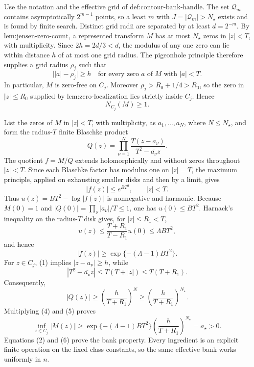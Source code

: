 Use the notation and the effective grid of \(\text{def:contour-bank-handle}\).  The set \(\mathcal Q_m\) contains asymptotically \(2^{m-1}\) points, so a least \(m\) with \(J=|\mathcal Q_m|>N_{\star}\) exists and is found by finite search.  Distinct grid radii are separated by at least \(d=2^{-m}\).  By \(\text{lem:jensen-zero-count}\), a represented transform \(M\) has at most \(N_{\star}\) zeros in \(|z|<T\), with multiplicity.  Since \(2h=2d/3<d\), the modulus of any one zero can lie within distance \(h\) of at most one grid radius.  The pigeonhole principle therefore supplies a grid radius \(\rho_j\) such that
\[
 \bigl||a|-\rho_j\bigr|\ge h
 \quad\text{for every zero }a\text{ of }M\text{ with }|a|<T. \tag{1}
\]
In particular, \(M\) is zero-free on \(C_j\).  Moreover \(\rho_j>R_0+1/4>R_0\), so the zero in \(|z|\le R_0\) supplied by \(\text{lem:zero-localization}\) lies strictly inside \(C_j\).  Hence
\[
 N_{C_j}(M)\ge1. \tag{2}
\]

List the zeros of \(M\) in \(|z|<T\), with multiplicity, as \(a_1,\ldots,a_N\), where \(N\le N_{\star}\), and form the radius-\(T\) finite Blaschke product
\[
 Q(z)=\prod_{\nu=1}^{N}
 \frac{T(z-a_{\nu})}{T^2-\overline{a_{\nu}}z}.
\]
The quotient \(f=M/Q\) extends holomorphically and without zeros throughout \(|z|<T\).  Since each Blaschke factor has modulus one on \(|z|=T\), the maximum principle, applied on exhausting smaller disks and then by a limit, gives
\[
 |f(z)|\le e^{BT^2},\qquad |z|<T. \tag{3}
\]
Thus \(u(z)=BT^2-\log|f(z)|\) is nonnegative and harmonic.  Because \(M(0)=1\) and \(|Q(0)|=\prod_{\nu}|a_{\nu}|/T\le1\), one has \(u(0)\le BT^2\).  Harnack's inequality on the radius-\(T\) disk gives, for \(|z|\le R_1<T\),
\[
 u(z)\le\frac{T+R_1}{T-R_1}u(0)
 \le\Lambda BT^2,
\]
and hence
\[
 |f(z)|\ge \exp\{-(\Lambda-1)BT^2\}. \tag{4}
\]
For \(z\in C_j\), (1) implies \(|z-a_{\nu}|\ge h\), while
\[
 |T^2-\overline{a_{\nu}}z|
 \le T(T+|z|)\le T(T+R_1).
\]
Consequently,
\[
 |Q(z)|
 \ge\left(\frac{h}{T+R_1}\right)^N
 \ge\left(\frac{h}{T+R_1}\right)^{N_{\star}}. \tag{5}
\]
Multiplying (4) and (5) proves
\[
 \inf_{z\in C_j}|M(z)|
 \ge \exp\{-(\Lambda-1)BT^2\}
 \left(\frac{h}{T+R_1}\right)^{N_{\star}}
 =a_{\star}>0. \tag{6}
\]
Equations (2) and (6) prove the bank property.  Every ingredient is an explicit finite operation on the fixed class constants, so the same effective bank works uniformly in \(n\).
